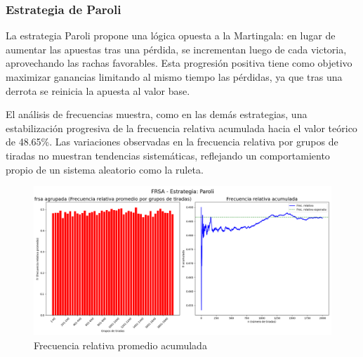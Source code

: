 \documentclass{article}
\begin{document}
\subsubsection{Estrategia de Paroli}
La estrategia Paroli propone una lógica opuesta a la Martingala: en lugar de aumentar las apuestas tras una pérdida, se incrementan luego de cada victoria, aprovechando las rachas favorables. Esta progresión positiva tiene como objetivo maximizar ganancias limitando al mismo tiempo las pérdidas, ya que tras una derrota se reinicia la apuesta al valor base.

El análisis de frecuencias muestra, como en las demás estrategias, una estabilización progresiva de la frecuencia relativa acumulada hacia el valor teórico de 48.65\%. Las variaciones observadas en la frecuencia relativa por grupos de tiradas no muestran tendencias sistemáticas, reflejando un comportamiento propio de un sistema aleatorio como la ruleta.
\begin{figure}[H]
    \centering
    \includegraphics[width=1\linewidth]{Imagenes/frsa_Paroli.png}
    \caption{Frecuencia relativa promedio acumulada}
    \label{fig:paroli_finita}
\end{figure}
\end{document}

